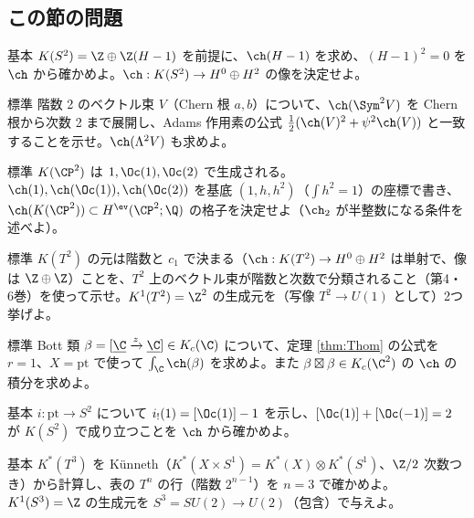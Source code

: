 \subsection*{この節の問題}
\begin{prob}{基本}\label{p:KS2}
$K(S^2)=\Z\oplus\Z(H-1)$ を前提に、$\ch(H-1)$ を求め、$(H-1)^2=0$ を $\ch$ から確かめよ。$\ch:K(S^2)\to H^0\oplus H^2$ の像を決定せよ。
\end{prob}
\begin{prob}{標準}\label{p:Sym2}
階数 2 のベクトル束 $V$（Chern 根 $a,b$）について、$\ch(\Sym^2V)$ を Chern 根から次数 2 まで展開し、Adams 作用素の公式 $\frac12(\ch(V)^2+\psi^2\ch(V))$ と一致することを示せ。$\ch(\Lambda^2V)$ も求めよ。
\end{prob}
\begin{prob}{標準}\label{p:KCP2}
$K(\CP^2)$ は $1,\Oc(1),\Oc(2)$ で生成される。$\ch(1),\ch(\Oc(1)),\ch(\Oc(2))$ を基底 $(1,h,h^2)$（$\int h^2=1$）の座標で書き、$\ch(K(\CP^2))\subset H^{\ev}(\CP^2;\Q)$ の格子を決定せよ（$\ch_2$ が半整数になる条件を述べよ）。
\end{prob}
\begin{prob}{標準}\label{p:KT2}
$K(T^2)$ の元は階数と $c_1$ で決まる（$\ch:K(T^2)\to H^0\oplus H^2$ は単射で、像は $\Z\oplus\Z$）ことを、$T^2$ 上のベクトル束が階数と次数で分類されること（第4・6巻）を使って示せ。$K^1(T^2)=\Z^2$ の生成元を（写像 $T^2\to U(1)$ として）2つ挙げよ。
\end{prob}
\begin{prob}{標準}\label{p:Bottclass}
Bott 類 $\beta=[\underline\C\xrightarrow z\underline\C]\in K_c(\C)$ について、定理 \ref{thm:Thom} の公式を $r=1$、$X=\mathrm{pt}$ で使って $\int_{\C}\ch(\beta)$ を求めよ。また $\beta\boxtimes\beta\in K_c(\C^2)$ の $\ch$ の積分を求めよ。
\end{prob}
\begin{prob}{基本}\label{p:gysin}
$i:\mathrm{pt}\to S^2$ について $i_!(1)=[\Oc(1)]-1$ を示し、$[\Oc(1)]+[\Oc(-1)]=2$ が $K(S^2)$ で成り立つことを $\ch$ から確かめよ。
\end{prob}
\begin{prob}{基本}\label{p:Ktable}
$K^*(T^3)$ を Künneth（$K^*(X\times S^1)=K^*(X)\otimes K^*(S^1)$、$\Z/2$ 次数つき）から計算し、表の $T^n$ の行（階数 $2^{n-1}$）を $n=3$ で確かめよ。$K^1(S^3)=\Z$ の生成元を $S^3=SU(2)\to U(2)$（包含）で与えよ。
\end{prob}
